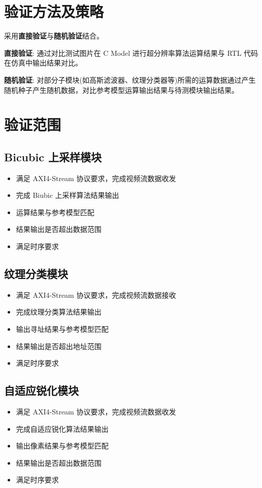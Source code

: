 \documentclass[12pt, a4paper, oneside]{ctexbook}
\begin{document}
	\chapter{验证方法及策略}
	采用\textbf{直接验证}与\textbf{随机验证}结合。\par
	\textbf{直接验证}: 通过对比测试图片在 C Model 进行超分辨率算法运算结果与 RTL 代码在仿真中输出结果对比。\par
	\textbf{随机验证}: 对部分子模块(如高斯滤波器、纹理分类器等)所需的运算数据通过产生随机种子产生随机数据，对比参考模型运算输出结果与待测模块输出结果。
	
	
	\chapter{验证范围}
		\section{Bicubic 上采样模块}
		\begin{itemize}
			\item 满足 AXI4-Stream 协议要求，完成视频流数据收发
			\item 完成 Biubic 上采样算法结果输出
			\item 运算结果与参考模型匹配
			\item 结果输出是否超出数据范围
			\item 满足时序要求
		\end{itemize}
	
		\section{纹理分类模块}
		\begin{itemize}
			\item 满足 AXI4-Stream 协议要求，完成视频流数据接收
			\item 完成纹理分类算法结果输出
			\item 输出寻址结果与参考模型匹配
			\item 结果输出是否超出地址范围
			\item 满足时序要求
		\end{itemize}

		\section{自适应锐化模块}
		\begin{itemize}
			\item 满足 AXI4-Stream 协议要求，完成视频流数据收发
			\item 完成自适应锐化算法结果输出
			\item 输出像素结果与参考模型匹配
			\item 结果输出是否超出数据范围
			\item 满足时序要求		
		\end{itemize}
	
\end{document}
